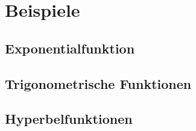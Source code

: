 %
%
%
\section{Beispiele
\label{buch:differentialgleichungen:section:beispiele}}

\subsection{Exponentialfunktion
\label{buch:differentialgleichungen:subsection:exponentialfunktion}}

\subsection{Trigonometrische Funktionen
\label{buch:differentialgleichungen:subsection:trigonometrisch}}

\subsection{Hyperbelfunktionen
\label{buch:differentialgleichungen:subsection:hyperbelfunktionen}}
